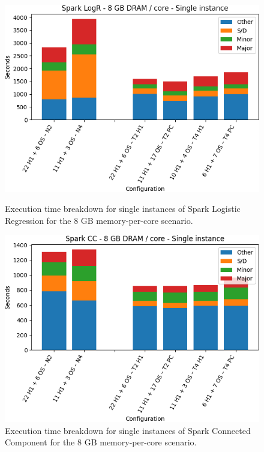 \begin{figure}[thbp]
        \centering
    \includegraphics[width=\linewidth]{./fig/logr64_single.png}
    \caption{Execution time breakdown for single instances of Spark
    Logistic Regression for the 8 GB memory-per-core scenario.}
    \label{fig:logr64_single}

    \includegraphics[width=\linewidth]{./fig/cc64_single.png}
    \caption{Execution time breakdown for single instances of Spark
    Connected Component for the 8 GB memory-per-core scenario.}
    \label{fig:cc64_single}
\end{figure}

